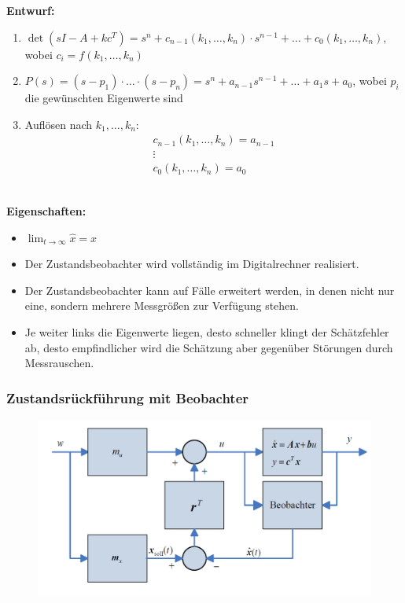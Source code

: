 \documentclass[10pt,a4paper]{article}
\newcommand{\tab}[1][1]{\hspace*{#1cm}}
\begin{document}
\textbf{Entwurf:}
\begin{enumerate}
	\item $\det(sI - A + kc^T) = s^n + c_{n-1}(k_1, \dots, k_n) ⋅ s^{n-1} + \dots + c_0(k_1, \dots, k_n)$, \tab wobei $c_i = f(k_1, \dots, k_n)$
	\item $P(s) = (s - p_1) ⋅ \dots ⋅ (s - p_n) = s^n + a_{n-1}s^{n - 1} + \dots + a_1s + a_0$, \tab wobei $p_i$ die gewünschten Eigenwerte sind
	\item Auflösen nach $k_1, \dots, k_n$: \\
	$$\begin{array}{c}
	c_{n-1}(k_1, \dots, k_n) = a_{n-1} \\
	\vdots \\
	c_0(k_1, \dots, k_n) = a_0
	\end{array}$$
\end{enumerate} ~\\

\textbf{Eigenschaften:}
\begin{itemize}
	\item $\lim_{t → ∞} \hat x = x$
	\item Der Zustandsbeobachter wird vollständig im Digitalrechner	realisiert.
	\item Der Zustandsbeobachter kann auf Fälle erweitert werden, in denen nicht nur eine, sondern mehrere Messgrößen zur Verfügung stehen.
	\item Je weiter links die Eigenwerte liegen, desto schneller klingt der Schätzfehler ab, desto empfindlicher wird die Schätzung aber gegenüber Störungen durch Messrauschen.
\end{itemize}

\subsubsection{Zustandsrückführung mit Beobachter}
\begin{figure}[H]
	\includegraphics[width=0.7\columnwidth]{imgs/abb7_13.png}
\end{figure}
\end{document}
